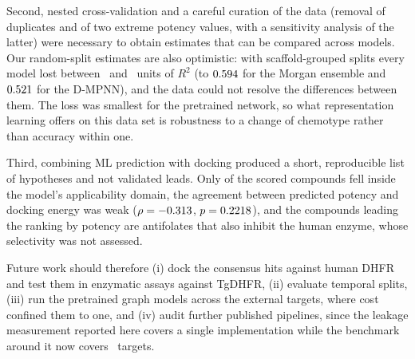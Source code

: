 Second, nested cross-validation and a careful curation of the data (removal of duplicates and of two extreme potency values, with a sensitivity analysis of the latter) were necessary to obtain estimates that can be compared across models. Our random-split estimates are also optimistic: with scaffold-grouped splits every model lost between \ScaffoldChemeleonDropRTwo\ and \ScaffoldRdkitTwoDDropRTwo\ units of $R^2$ (to $0.594$ for the Morgan ensemble and $0.521$ for the D-MPNN), and the data could not resolve the differences between them. The loss was smallest for the pretrained network, so what representation learning offers on this data set is robustness to a change of chemotype rather than accuracy within one.

Third, combining ML prediction with docking produced a short, reproducible list of hypotheses and not validated leads. Only \ScreenNDomain{} of the \ScreenNStructural{} scored compounds fell inside the model's applicability domain, the agreement between predicted potency and docking energy was weak ($\rho = -0.313$, $p = 0.2218$), and the compounds leading the ranking by potency are antifolates that also inhibit the human enzyme, whose selectivity was not assessed.

Future work should therefore (i) dock the consensus hits against human DHFR and test them in enzymatic assays against TgDHFR, (ii) evaluate temporal splits, (iii) run the pretrained graph models across the external targets, where cost confined them to one, and (iv) audit further published pipelines, since the leakage measurement reported here covers a single implementation while the benchmark around it now covers \GenNTargets\ targets.
